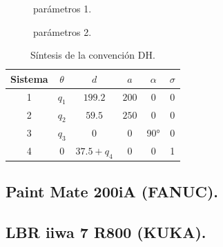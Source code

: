 \documentclass[a4paper,12pt]{article}
\begin{document}
\begin{figure}[H]
    \centering
    \begin{adjustbox}{scale = 0.66, max width=\columnwidth}
    \end{adjustbox}
    \caption{parámetros 1.}
\end{figure}

\begin{figure}[H]
    \centering
    \begin{adjustbox}{scale = 0.66, max width=\columnwidth}
    \end{adjustbox}
    \caption{parámetros 2.}
\end{figure}

\begin{table}[H]
    \centering
    \begin{tabular}{|c|c|c|c|c|c|}
    \hline
    Sistema & $\theta$  & $d$           & $a$    & $\alpha$ & $\sigma$ \\ \hline
    1       & $q_1$     & $199.2$       & $200$  & 0        & 0        \\ \hline
    2       & $q_2$     & $59.5$        & $250$  & 0        & 0        \\ \hline
    3       & $q_3$     & $0$           & $0$    & 90°      & 0        \\ \hline
    4       & $0$       & $37.5 + q_4$  & $0$    & 0        & 1        \\ \hline
    \end{tabular}
    \caption{Síntesis de la convención DH.}
    \label{sintesis_DH_scara}
\end{table}

\subsection{Paint Mate 200iA (FANUC).}

\subsection{LBR iiwa 7 R800 (KUKA).}
\end{document}
